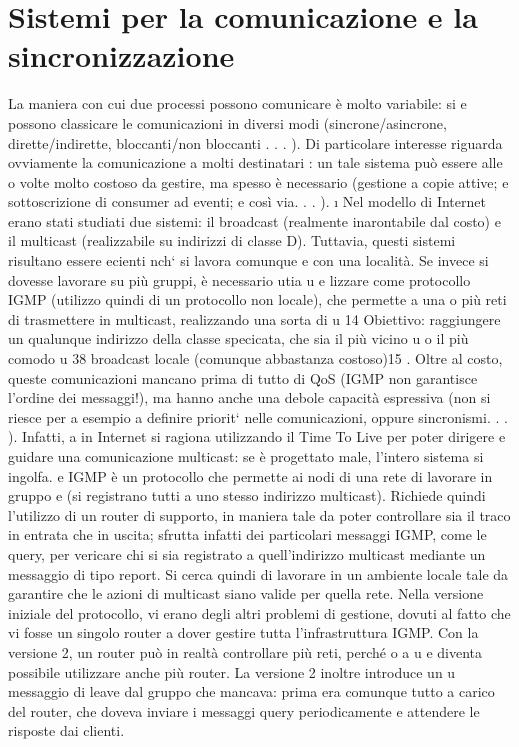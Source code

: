 \documentclass[a4paper,12pt]{article}
\begin{document}
\section{Sistemi per la comunicazione e la sincronizzazione}
La maniera con cui due processi possono comunicare è molto variabile: si
e
possono classicare le comunicazioni in diversi modi (sincrone/asincrone, dirette/indirette, bloccanti/non bloccanti . .
. ). Di particolare interesse riguarda
ovviamente la comunicazione a molti destinatari : un tale sistema può essere alle
o
volte molto costoso da gestire, ma spesso è necessario (gestione a copie attive;
e
sottoscrizione di consumer ad eventi; e così via. . . ).
\i{}
Nel modello di Internet erano stati studiati due sistemi: il broadcast (realmente inarontabile dal costo) e il multicast
(realizzabile su indirizzi di classe
D). Tuttavia, questi sistemi risultano essere ecienti nch` si lavora comunque
e
con una località. Se invece si dovesse lavorare su più gruppi, è necessario utia
u
e
lizzare come protocollo IGMP (utilizzo quindi di un protocollo non locale), che
permette a una o più reti di trasmettere in multicast, realizzando una sorta di
u
14 Obiettivo: raggiungere un qualunque indirizzo della classe specicata, che sia il più vicino
u
o il più comodo
u
38
broadcast locale (comunque abbastanza costoso)15 . Oltre al costo, queste comunicazioni mancano prima di tutto di QoS
(IGMP non garantisce l'ordine dei
messaggi!), ma hanno anche una debole capacità espressiva (non si riesce per
a
esempio a definire priorit` nelle comunicazioni, oppure sincronismi. . . ). Infatti,
a
in Internet si ragiona utilizzando il Time To Live per poter dirigere e guidare
una comunicazione multicast: se è progettato male, l'intero sistema si ingolfa.
e
IGMP è un protocollo che permette ai nodi di una rete di lavorare in gruppo
e
(si registrano tutti a uno stesso indirizzo multicast). Richiede quindi l'utilizzo
di un router di supporto, in maniera tale da poter controllare sia il traco in
entrata che in uscita; sfrutta infatti dei particolari messaggi IGMP, come le
query, per vericare chi si sia registrato a quell'indirizzo multicast mediante un
messaggio di tipo report. Si cerca quindi di lavorare in un ambiente locale tale
da garantire che le azioni di multicast siano valide per quella rete.
Nella versione iniziale del protocollo, vi erano degli altri problemi di gestione,
dovuti al fatto che vi fosse un singolo router a dover gestire tutta l'infrastruttura
IGMP. Con la versione 2, un router può in realtà controllare più reti, perché
o
a
u
e
diventa possibile utilizzare anche più router. La versione 2 inoltre introduce un
u
messaggio di leave dal gruppo che mancava: prima era comunque tutto a carico
del router, che doveva inviare i messaggi query periodicamente e attendere le
risposte dai clienti.
\end{document}

